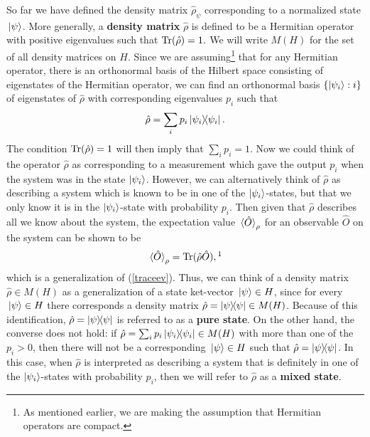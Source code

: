      So far we have defined the density matrix $\hat{\rho}_\psi$ corresponding to a normalized state $\ket*{\psi}$. More generally, a \textbf{density matrix} $\hat{\rho}$ is defined to be a Hermitian operator with positive eigenvalues such that $\operatorname{Tr}(\hat{\rho})=1.$ We will write $M(H)$ for the set of all density matrices on $H$. Since we are assuming\footnote{As mentioned earlier, we are making the assumption that Hermitian operators are compact.} that for any Hermitian operator, there is an orthonormal basis of the Hilbert space consisting of eigenstates of the Hermitian operator, we can find an orthonormal basis $\{\ket{\psi_i}:i\}$ of eigenstates of $\hat{\rho}$ with corresponding eigenvalues $p_i$ such that 
    \begin{equation}\label{rhodiag}
    \hat{\rho}=\sum_i p_i\dyad{\psi_i}.
    \end{equation} 
    The condition $\operatorname{Tr}(\hat{\rho})=1$ will then imply that $\sum_i p_i =1$. Now we could think of the operator $\hat{\rho}$ as corresponding to a measurement which gave the output $p_i$ when the system was in the state $\ket{\psi_i}$. However, we can alternatively think of $\hat{\rho}$ as describing a system which is known to be in one of the $\ket{\psi_i}$-states, but that we only know it is in the $\ket{\psi_i}$-state with probability $p_i$. Then given that $\hat{\rho}$ describes all we know about the system, the expectation value $\ev*{\hat{O}}_\rho$ for an observable $\hat{O}$ on the system can be shown to be 
    \begin{equation}\label{expdensity}\ev*{\hat{O}}_\rho=\Tr(\hat{\rho}\hat{O}),\protect\footnotemark\end{equation}which is a generalization of (\ref{traceev}). Thus, we can think of a density matrix $\hat{\rho}\in M(H)$ as a generalization \label{genket} of a state ket-vector $\ket*{\psi}\in H$, since for every $\ket*{\psi}\in H$ there corresponds a density matrix $\hat{\rho}=\dyad{\psi}\in M(H)$. Because of this identification, $\hat{\rho}=\dyad{\psi}$ is referred to as a \textbf{pure state}. On the other hand, the converse does not hold: if $\hat{\rho}=\sum_i p_i\dyad{\psi_i}\in M(H)$ with more than one of the $p_i> 0$, then there will not be a corresponding $\ket*{\psi}\in H$ such that $\hat{\rho}=\dyad{\psi}$. In this case, when $\hat{\rho}$ is interpreted as describing a system that is definitely in one of the $\ket{\psi_i}$-states with probability $p_i$, then we will refer to $\hat{\rho}$ as a \textbf{mixed state}.\label{mixedstate}
